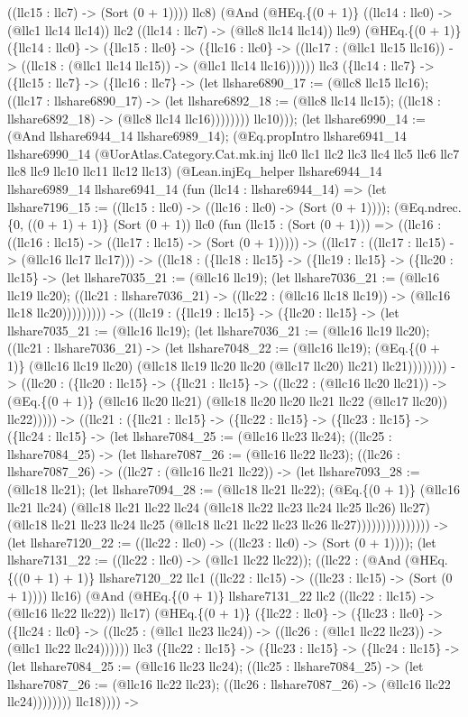 \documentclass[11pt]{article}
\begin{document}
((llc15 : llc7) -> (Sort (0 + 1)))) llc8) (@And (@HEq.\{(0 + 1)\} ((llc14 : llc0) -> (@llc1 llc14 llc14)) llc2 ((llc14 : llc7) -> (@llc8 llc14 llc14)) llc9) (@HEq.\{(0 + 1)\} (\{llc14 : llc0\} -> (\{llc15 : llc0\} -> (\{llc16 : llc0\} -> ((llc17 : (@llc1 llc15 llc16)) -> ((llc18 : (@llc1 llc14 llc15)) -> (@llc1 llc14 llc16)))))) llc3 (\{llc14 : llc7\} -> (\{llc15 : llc7\} -> (\{llc16 : llc7\} -> (let llshare6890\_17 := (@llc8 llc15 llc16); ((llc17 : llshare6890\_17) -> (let llshare6892\_18 := (@llc8 llc14 llc15); ((llc18 : llshare6892\_18) -> (@llc8 llc14 llc16)))))))) llc10))); (let llshare6990\_14 := (@And llshare6944\_14 llshare6989\_14); (@Eq.propIntro llshare6941\_14 llshare6990\_14 (@UorAtlas.Category.Cat.mk.inj llc0 llc1 llc2 llc3 llc4 llc5 llc6 llc7 llc8 llc9 llc10 llc11 llc12 llc13) (@Lean.injEq\_helper llshare6944\_14 llshare6989\_14 llshare6941\_14 (fun (llc14 : llshare6944\_14) => (let llshare7196\_15 := ((llc15 : llc0) -> ((llc16 : llc0) -> (Sort (0 + 1)))); (@Eq.ndrec.\{0, ((0 + 1) + 1)\} (Sort (0 + 1)) llc0 (fun (llc15 : (Sort (0 + 1))) => ((llc16 : ((llc16 : llc15) -> ((llc17 : llc15) -> (Sort (0 + 1))))) -> ((llc17 : ((llc17 : llc15) -> (@llc16 llc17 llc17))) -> ((llc18 : (\{llc18 : llc15\} -> (\{llc19 : llc15\} -> (\{llc20 : llc15\} -> (let llshare7035\_21 := (@llc16 llc19); (let llshare7036\_21 := (@llc16 llc19 llc20); ((llc21 : llshare7036\_21) -> ((llc22 : (@llc16 llc18 llc19)) -> (@llc16 llc18 llc20))))))))) -> ((llc19 : (\{llc19 : llc15\} -> (\{llc20 : llc15\} -> (let llshare7035\_21 := (@llc16 llc19); (let llshare7036\_21 := (@llc16 llc19 llc20); ((llc21 : llshare7036\_21) -> (let llshare7048\_22 := (@llc16 llc19); (@Eq.\{(0 + 1)\} (@llc16 llc19 llc20) (@llc18 llc19 llc20 llc20 (@llc17 llc20) llc21) llc21)))))))) -> ((llc20 : (\{llc20 : llc15\} -> (\{llc21 : llc15\} -> ((llc22 : (@llc16 llc20 llc21)) -> (@Eq.\{(0 + 1)\} (@llc16 llc20 llc21) (@llc18 llc20 llc20 llc21 llc22 (@llc17 llc20)) llc22))))) -> ((llc21 : (\{llc21 : llc15\} -> (\{llc22 : llc15\} -> (\{llc23 : llc15\} -> (\{llc24 : llc15\} -> (let llshare7084\_25 := (@llc16 llc23 llc24); ((llc25 : llshare7084\_25) -> (let llshare7087\_26 := (@llc16 llc22 llc23); ((llc26 : llshare7087\_26) -> ((llc27 : (@llc16 llc21 llc22)) -> (let llshare7093\_28 := (@llc18 llc21); (let llshare7094\_28 := (@llc18 llc21 llc22); (@Eq.\{(0 + 1)\} (@llc16 llc21 llc24) (@llc18 llc21 llc22 llc24 (@llc18 llc22 llc23 llc24 llc25 llc26) llc27) (@llc18 llc21 llc23 llc24 llc25 (@llc18 llc21 llc22 llc23 llc26 llc27))))))))))))))) -> (let llshare7120\_22 := ((llc22 : llc0) -> ((llc23 : llc0) -> (Sort (0 + 1)))); (let llshare7131\_22 := ((llc22 : llc0) -> (@llc1 llc22 llc22)); ((llc22 : (@And (@HEq.\{((0 + 1) + 1)\} llshare7120\_22 llc1 ((llc22 : llc15) -> ((llc23 : llc15) -> (Sort (0 + 1)))) llc16) (@And (@HEq.\{(0 + 1)\} llshare7131\_22 llc2 ((llc22 : llc15) -> (@llc16 llc22 llc22)) llc17) (@HEq.\{(0 + 1)\} (\{llc22 : llc0\} -> (\{llc23 : llc0\} -> (\{llc24 : llc0\} -> ((llc25 : (@llc1 llc23 llc24)) -> ((llc26 : (@llc1 llc22 llc23)) -> (@llc1 llc22 llc24)))))) llc3 (\{llc22 : llc15\} -> (\{llc23 : llc15\} -> (\{llc24 : llc15\} -> (let llshare7084\_25 := (@llc16 llc23 llc24); ((llc25 : llshare7084\_25) -> (let llshare7087\_26 := (@llc16 llc22 llc23); ((llc26 : llshare7087\_26) -> (@llc16 llc22 llc24)))))))) llc18)))) -> 
\end{document}
